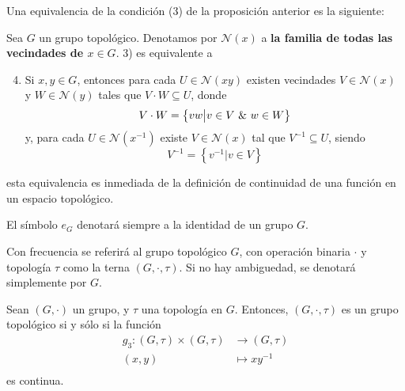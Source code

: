 \documentclass[12pt]{report}
\theoremstyle{largebreak}
\newcommand{\N}[1]{\ensuremath{\mathscr{N}(#1)}}
\begin{document}
    \begin{obs}
        Una equivalencia de la condición (3) de la proposición anterior es la siguiente:

        Sea $G$ un grupo topológico. Denotamos por $\mathscr{N}(x)$ a \textbf{ la familia de todas las vecindades de $x\in G$}. 3) es equivalente a
        \begin{enumerate}
            \setcounter{enumi}{3}
            \item Si $x,y\in G$, entonces para cada $U\in \mathscr{N}(xy)$ existen vecindades $V\in \mathscr{N}(x)$ y $W\in \mathscr{N}(y)$ tales que $V\cdot W\subseteq U$, donde
            \begin{equation*}
                V\cdot W = \left\{vw \big| v\in V \textup{ \& } w\in W \right\}
            \end{equation*}
            y, para cada $U\in\N{x^{-1}}$ existe $V\in\N{x}$ tal que $V^{-1}\subseteq U$, siendo
            \begin{equation*}
                V^{-1}=\left\{v^{-1}\big| v\in V \right\}
            \end{equation*}
        \end{enumerate}

        esta equivalencia es inmediada de la definición de continuidad de una función en un espacio topológico.
    \end{obs}

    \begin{obs}
        El símbolo $e_G$ denotará siempre a la identidad de un grupo $G$.

        Con frecuencia se referirá al grupo topológico $G$, con operación binaria $\cdot$ y topología $\tau$ como la terna $(G,\cdot,\tau)$. Si no hay ambiguedad, se denotará simplemente por $G$.
    \end{obs}

    \begin{lema}
        Sean $(G,\cdot)$ un grupo, y $\tau$ una topología en $G$. Entonces, $(G,\cdot,\tau)$ es un grupo topológico si y sólo si la función
        \begin{equation*}
            \begin{split}
                g_3:(G,\tau)\times (G,\tau)&\rightarrow(G,\tau)\\
                (x,y)&\mapsto xy^{-1}\\
            \end{split}
        \end{equation*}
        es continua.
    \end{lema}
\end{document}
